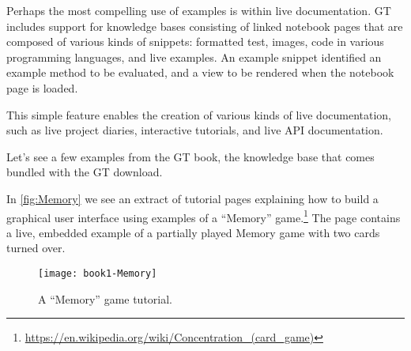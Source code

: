 \documentclass[sigplan,anonymous,review,10pt]{acmart}
\begin{document}

Perhaps the most compelling use of examples is within live documentation.
GT includes support for knowledge bases consisting of linked notebook pages that are composed of various kinds of snippets: formatted test, images, code in various programming languages, and live examples.
An example snippet identified an example method to be evaluated, and a view to be rendered when the notebook page is loaded.

This simple feature enables the creation of various kinds of live documentation, such as live project diaries, interactive tutorials, and live API documentation.

Let's see a few examples from the GT book, the knowledge base that comes bundled with the GT download.

In \autoref{fig:Memory} we see an extract of tutorial pages explaining how to build a graphical user interface using examples of a ``Memory'' game.\footnote{\url{https://en.wikipedia.org/wiki/Concentration_(card_game)}}
The page contains a live, embedded example of a partially played Memory game with two cards turned over.

\begin{figure}[h]
  \texttt{[image: book1-Memory]}
  \caption{A ``Memory'' game tutorial.}
  \label{fig:Memory}
\end{figure}



\end{document}
